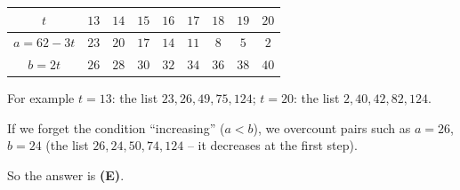 {
\begin{center}\small
\begin{tabular}{|c|c|c|c|c|c|c|c|c|}
\hline
\rowcolor{tmBlue!10}$t$ & $13$ & $14$ & $15$ & $16$ & $17$ & $18$ & $19$ & $20$\\ \hline
$a=62-3t$ & $23$ & $20$ & $17$ & $14$ & $11$ & $8$ & $5$ & $2$\\ \hline
$b=2t$ & $26$ & $28$ & $30$ & $32$ & $34$ & $36$ & $38$ & $40$\\ \hline
\end{tabular}
\end{center}
For example $t=13$: the list $23, 26, 49, 75, 124$; $t=20$: the list $2, 40, 42, 82, 124$.
\begin{warnbox}If we forget the condition ``increasing'' ($a<b$), we overcount pairs such as $a=26$, $b=24$ (the list $26, 24, 50, 74, 124$ -- it decreases at the first step).\end{warnbox}
So the answer is \textbf{(E)}.
}


